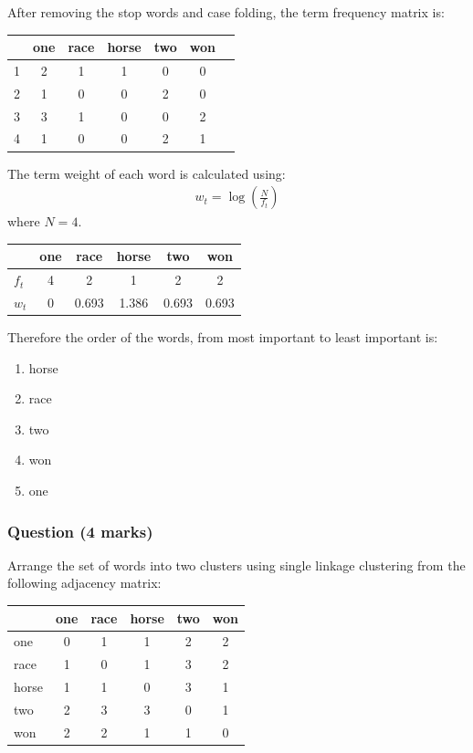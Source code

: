 \documentclass{uws_learning_guide}
\begin{document}
After removing the stop words and case folding, the term frequency matrix is:
\begin{center}
\begin{tabular}{lcccccc}
\toprule
  & one & race & horse & two & won \\
\midrule
1 & 2 & 1 & 1 & 0 & 0 \\
2 & 1 & 0 & 0 & 2 & 0 \\
3 & 3 & 1 & 0 & 0 & 2 \\
4 & 1 & 0 & 0 & 2 & 1 \\
\bottomrule
\end{tabular}
\end{center}
The term weight of each word is calculated using:
\begin{align*}
  w_t = \log{\left (\frac{N}{f_t}\right )}
\end{align*}
where $N = 4$.
\begin{center}
\begin{tabular}{lccccc}
\toprule
  & one & race & horse & two & won \\
\midrule
$f_t$ & 4 & 2 & 1 & 2 & 2 \\
$w_t$ & 0 & 0.693 & 1.386 & 0.693 & 0.693 \\
\bottomrule
\end{tabular}
\end{center}
Therefore the order of the words, from most important to least important is:
\begin{enumerate}
\item horse
\item race 
\item two 
\item won 
\item one
\end{enumerate}


\subsubsection*{Question (4 marks)}

Arrange the set of words into two clusters using single linkage clustering from the following adjacency matrix:
\begin{center}
\begin{tabular}{lccccc}
\toprule
  & one & race & horse & two & won \\
\midrule
one   & 0 & 1 & 1 & 2 & 2 \\
race  & 1 & 0 & 1 & 3 & 2 \\
horse & 1 & 1 & 0 & 3 & 1 \\
two   & 2 & 3 & 3 & 0 & 1 \\
won   & 2 & 2 & 1 & 1 & 0 \\
\bottomrule
\end{tabular}
\end{center}
\end{document}
